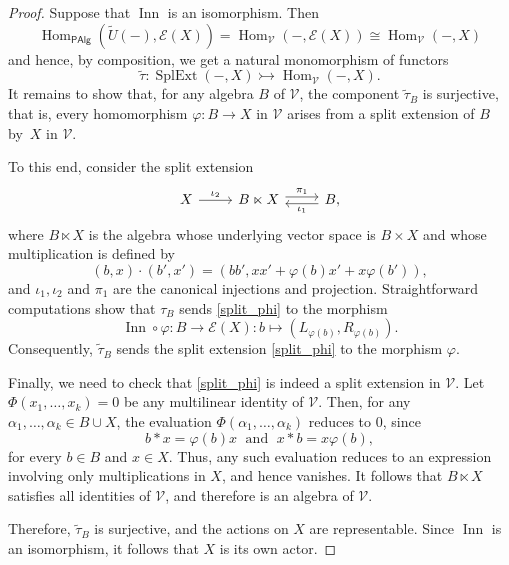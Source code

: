 \documentclass[reqno,a4paper]{amsart}
\theoremstyle{plain}
\theoremstyle{definition}
\theoremstyle{remark}
\numberwithin{equation}{section}
\newcommand{\E}{\mathcal{E}}
\newcommand{\V}{\mathcal{V}}
\DeclareMathOperator{\Hom}{Hom}
\DeclareMathOperator{\SplExt}{SplExt}
\DeclareMathOperator{\Inn}{Inn}
\newcommand{\PAlg}{\ensuremath{\mathsf{PAlg}}}
\begin{document}
\begin{proof}
Suppose that $\Inn$ is an isomorphism. Then
\[
\Hom_{\PAlg}(\widetilde{U}(-),\E(X))=\Hom_{\V}(-,\E(X)) \cong \Hom_{\V}(-,X)
\]
and hence, by composition, we get a natural monomorphism of functors
\[
\widetilde{\tau} \colon \SplExt(-,X) \rightarrowtail \Hom_{\V}(-,X).
\]
It remains to show that, for any algebra $B$ of $\V$, the component $\widetilde{\tau}_B$ is surjective, that is, every homomorphism $\varphi \colon B \to X$ in $\V$ arises from a split extension of $B$ by~$X$ in $\V$.

To this end, consider the split extension
\begin{equation}\label{split_phi}
\begin{tikzcd}
X \arrow[r, "\iota_2"] &
B \ltimes X \arrow[r, shift left, "\pi_1"] &
B, \arrow[l, shift left, "\iota_1"]
\end{tikzcd}
\end{equation}
where $B \ltimes X$ is the algebra whose underlying vector space is $B \times X$ and whose multiplication is defined by
\[
(b,x) \cdot (b',x') = (bb', xx' + \varphi(b)x' + x\varphi(b')),
\]
and $\iota_1, \iota_2$ and $\pi_1$ are the canonical injections and projection. Straightforward computations show that $\tau_B$ sends \eqref{split_phi} to the morphism
\[
\Inn \circ \varphi \colon B \to \E(X) \colon b \mapsto (L_{\varphi(b)}, R_{\varphi(b)}).
\]
Consequently, $\widetilde{\tau}_B$ sends the split extension \eqref{split_phi} to the morphism $\varphi$.

Finally, we need to check that \eqref{split_phi} is indeed a split extension in $\V$. Let $\Phi(x_1,\ldots,x_k)=0$ be any multilinear identity of $\V$. Then, for any $\alpha_1,\ldots,\alpha_k \in B \cup X$, the evaluation $\Phi(\alpha_1,\ldots,\alpha_k)$ reduces to $0$, since
\[
b \ast x = \varphi(b)x \; \text{ and } \; x \ast b = x\varphi(b),
\]
for every $b \in B$ and $x \in X$. Thus, any such evaluation reduces to an expression involving only multiplications in $X$, and hence vanishes. It follows that $B \ltimes X$ satisfies all identities of $\V$, and therefore is an algebra of $\V$.

Therefore, $\widetilde{\tau}_B$ is surjective, and the actions on $X$ are representable. Since $\Inn$ is an isomorphism, it follows that $X$ is its own actor.
\end{proof}
\end{document}
